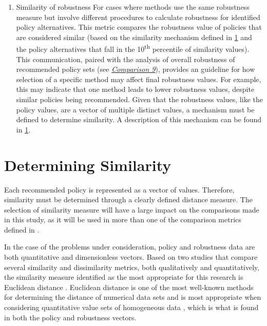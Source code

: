 \begin{enumerate}[leftmargin=*,align=left,label=\textbf{Comparison \arabic* :}]
\begin{enumerate}[resume,leftmargin=*,align=left,label=\textbf{Comparison \arabic* :}]
    \item Similarity of robustness \newline
          For cases where methods use the same robustness measure but involve different procedures to calculate robustness for identified policy alternatives. This metric compares the robustness value of policies that are considered similar (based on the similarity mechanism defined in \cref{compare-policysimilarity} and the policy alternatives that fall in the 10\textsuperscript{th} percentile of similarity values). This communication, paired with the analysis of overall robustness of recommended policy sets (see \hyperref[compare-robustness]{\textit{Comparison 9}}), provides an guideline for how selection of a specific method may affect final robustness values. For example, this may indicate that one method leads to lower robustness values, despite similar policies being recommended. Given that the robustness values, like the policy values, are a vector of multiple distinct values, a mechanism must be defined to determine similarity. A description of this mechanism can be found in \cref{compare-policysimilarity}. 
\end{enumerate}

\section{Determining Similarity} \label{compare-policysimilarity}
Each recommended policy is represented as a vector of values. Therefore, similarity must be determined through a clearly defined distance measure. The selection of similarity measure will have a large impact on the comparisons made in this study, as it will be used in more than one of the comparison metrics defined in . 

In the case of the problems under consideration, policy and robustness data are both quantitative and dimensionless vectors. Based on two studies that compare several similarity and dissimilarity metrics, both qualitatively and quantitatively, the similarity measure identified as the most appropriate for this research is Euclidean distance \cite{Buttigieg2014, Shirkhorshidi2015}. Euclidean distance is one of the most well-known methods for determining the distance of numerical data sets \citep{Shirkhorshidi2015} and is most appropriate when considering quantitative value sets of homogeneous data \citep{Buttigieg2014}, which is what is found in both the policy and robustness vectors. 


\end{enumerate}
